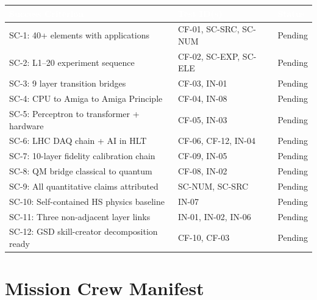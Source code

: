 \documentclass[11pt,letterpaper]{article}
\newcommand{\tableheader}[1]{\textbf{\sffamily\textcolor{white}{#1}}}
\begin{document}
\begin{center}
\begin{tabularx}{\textwidth}{XL{3.5cm}C{1.5cm}}
\toprule
{}
\tableheader{Success Criterion} & \tableheader{Test ID(s)} & \tableheader{Status} \\
\midrule
SC-1: 40+ elements with applications & CF-01, SC-SRC, SC-NUM & Pending \\
SC-2: L1--20 experiment sequence & CF-02, SC-EXP, SC-ELE & Pending \\
SC-3: 9 layer transition bridges & CF-03, IN-01 & Pending \\
SC-4: CPU to Amiga to Amiga Principle & CF-04, IN-08 & Pending \\
SC-5: Perceptron to transformer + hardware & CF-05, IN-03 & Pending \\
SC-6: LHC DAQ chain + AI in HLT & CF-06, CF-12, IN-04 & Pending \\
SC-7: 10-layer fidelity calibration chain & CF-09, IN-05 & Pending \\
SC-8: QM bridge classical to quantum & CF-08, IN-02 & Pending \\
SC-9: All quantitative claims attributed & SC-NUM, SC-SRC & Pending \\
SC-10: Self-contained HS physics baseline & IN-07 & Pending \\
SC-11: Three non-adjacent layer links & IN-01, IN-02, IN-06 & Pending \\
SC-12: GSD skill-creator decomposition ready & CF-10, CF-03 & Pending \\
\bottomrule
\end{tabularx}
\end{center}

\section{Mission Crew Manifest}
\end{document}
